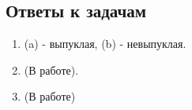  \subsection*{Ответы к задачам}
 \begin{enumerate}
    \item (a) - выпуклая, (b) - невыпуклая.
    \item (В работе).
    \item (В работе)
 \end{enumerate}
